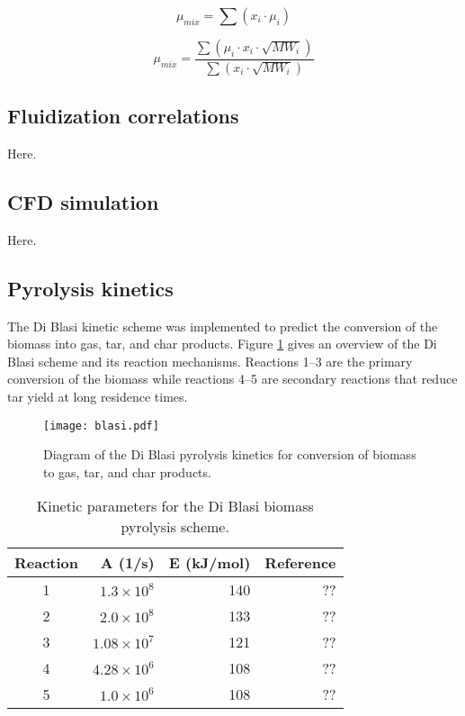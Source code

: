 \begin{equation}\label{eq:graham}
    \mu_{mix} = \sum(x_i \cdot \mu_i)
\end{equation}

\begin{equation}\label{eq:herning}
    \mu_{mix} = \frac{\sum(\mu_i \cdot x_i \cdot \sqrt{MW_i})}{\sum(x_i \cdot \sqrt{MW_i})}
\end{equation}

\subsection{Fluidization correlations}

Here.

\subsection{CFD simulation}

Here.

\subsection{Pyrolysis kinetics}

The Di Blasi kinetic scheme was implemented to predict the conversion of the biomass into gas, tar, and char products. Figure \ref{fig:blasi} gives an overview of the Di Blasi scheme and its reaction mechanisms. Reactions 1--3 are the primary conversion of the biomass while reactions 4--5 are secondary reactions that reduce tar yield at long residence times.

\begin{figure}[H]
    \centering
    \texttt{[image: blasi.pdf]}
    \caption{Diagram of the Di Blasi pyrolysis kinetics for conversion of biomass to gas, tar, and char products.}
    \label{fig:blasi}
\end{figure}

\begin{table}[H]
    \centering
    \caption{Kinetic parameters for the Di Blasi biomass pyrolysis scheme.}
    \begin{tabular}{crrr}
        \hline
        Reaction    & A (1/s)               & E (kJ/mol)    & Reference     \\
        \hline
        1           & $1.3 \times 10^8$     & 140           & ??            \\
        2           & $2.0 \times 10^8$     & 133           & ??            \\
        3           & $1.08 \times 10^7$    & 121           & ??            \\
        4           & $4.28 \times 10^6$    & 108           & ??            \\
        5           & $1.0 \times 10^6$     & 108           & ??            \\
        \hline
    \end{tabular}
\end{table}

